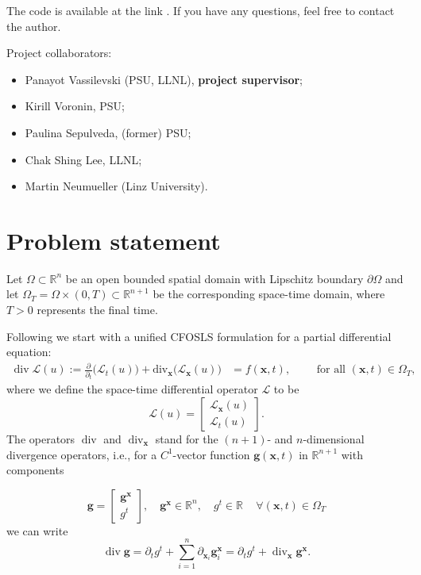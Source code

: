 \documentclass[a4paper,12pt]{amsart}
\numberwithin{equation}{section}
\renewcommand{\div}{\operatorname{div}}
\renewcommand{\L}{{\mathcal L}}
\def\XVec#1{{\mathbf #1}}
\def\Xx{\XVec{x}}
\begin{document}
The code is available at the link \cite{cfosls_code}. If you have any questions, feel free to contact the author.

Project collaborators:
\begin{itemize}
	\item Panayot Vassilevski (PSU, LLNL), \textbf{project supervisor};
	\item Kirill Voronin, PSU;
	\item Paulina Sepulveda, (former) PSU;
	\item Chak Shing Lee, LLNL;
	\item Martin Neumueller (Linz University).
\end{itemize}

\section{Problem statement}


\bigskip

Let $\Omega\subset \mathbb{R}^n$ be an open bounded spatial domain with Lipschitz boundary $\partial \Omega$ and let 
$\Omega_{T} = \Omega\times (0,T)\subset \mathbb{R}^{n+1}$ be the corresponding space-time domain,  where $T>0$ represents the final time.  

Following \cite{our_cfosls_paper} we start with a unified CFOSLS formulation for a partial differential equation:
\begin{align} \label{Problem}
\div \L(u) := \frac{\partial}{\partial_t} \big(\L_t(u) \big)+ \mathrm{div}_\Xx \big( \L_\Xx (u)\big)& = f(\Xx, t), \qquad \text{ for all } (\Xx,t) \in \Omega_T,
\end{align}
where we define the space-time differential operator $\L$ to be
\[
\L(u) =  \begin{bmatrix} \L_\Xx(u) \\ \L_t(u) \end{bmatrix}.
\]
The operators $\div$ and $\div_\Xx$ stand for the $(n+1)$- and $n$-dimensional divergence operators, i.e., for a $C^1$-vector function $\mathbf{g}(\Xx,t)$ in $\mathbb{R}^{n+1}$ with components

$$
\mathbf{g} =  \begin{bmatrix} \mathbf{g}^\Xx 
\\ g^t \end{bmatrix}, \quad 
\mathbf{g}^\Xx \in \mathbb{R}^{n}, \quad g^t \in \mathbb{R} \quad \, \forall (\Xx,t) \in \Omega_T
$$
we can write
$$
\div \mathbf{g} = \partial_t g^t + \sum_{i = 1}^{n} \partial_{\Xx_i} \mathbf{g}^{\Xx}_i = \partial_t g^t + \div_\Xx \mathbf{g}^{\Xx}.
$$
\end{document}
